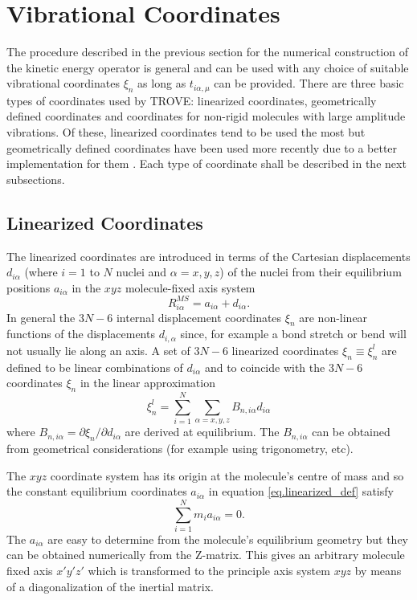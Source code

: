 \section{Vibrational Coordinates}
The procedure described in the previous section for the numerical construction of the kinetic energy operator is general
and can be used with any choice of suitable vibrational coordinates $\xi_n$ as long as $t_{i \alpha,\mu}$ can be provided.
There are three basic types of coordinates used by TROVE: linearized coordinates, geometrically defined coordinates and
coordinates for non-rigid molecules with large amplitude vibrations. Of these, linearized coordinates tend to be 
used the most but geometrically defined coordinates have been used more recently due to a better implementation for them 
\cite{15YaYuxx.method}. Each type of coordinate shall be described in the next subsections.

\subsection{Linearized Coordinates}
The linearized coordinates are introduced in terms of the Cartesian displacements $d_{i \alpha}$ (where $i = 1$ to $N$ 
nuclei and
$\alpha = x,y,z$) of the nuclei from their equilibrium positions $a_{i \alpha}$ in the $xyz$ molecule-fixed axis system
\begin{equation}
\label{eq.linearized_def}
R^{MS}_{i \alpha} = a_{i \alpha} + d_{i \alpha}.
\end{equation}
In general the $3N - 6$ internal displacement coordinates $\xi_n$ are non-linear functions of the displacements $d_{i,\alpha}$
since, for example a bond stretch or bend will not usually lie along an axis. A set of $3N-6$ linearized coordinates
$\xi_n \equiv \xi_n^l$ are defined to be linear combinations of $d_{i \alpha}$ and to coincide with the $3N-6$ coordinates
$\xi_n$ in the linear approximation
\begin{equation}
\label{eq.linearized_def2}
\xi_n^l = \sum_{i=1}^N \sum_{\alpha=x,y,z} B_{n,i \alpha} d_{i \alpha}
\end{equation}
where $B_{n,i \alpha} = \partial \xi_n / \partial d_{i \alpha}$ are derived at equilibrium. The $B_{n,i \alpha}$ can be 
obtained from geometrical considerations (for example using trigonometry, etc).

The $xyz$ coordinate system has its origin at the molecule's centre of mass and so the constant equilibrium coordinates 
$a_{i \alpha}$ in equation \ref{eq.linearized_def} satisfy
\begin{equation}
\label{eq.centre_of_mass}
\sum_{i=1}^N m_i a_{i \alpha} = 0.
\end{equation}
The $a_{i \alpha}$ are easy to determine from the molecule's equilibrium geometry but they can be obtained numerically from the
Z-matrix. This gives an arbitrary molecule fixed axis $x'y'z'$ which is transformed to the principle axis system $xyz$ by
means of a diagonalization of the inertial matrix.

